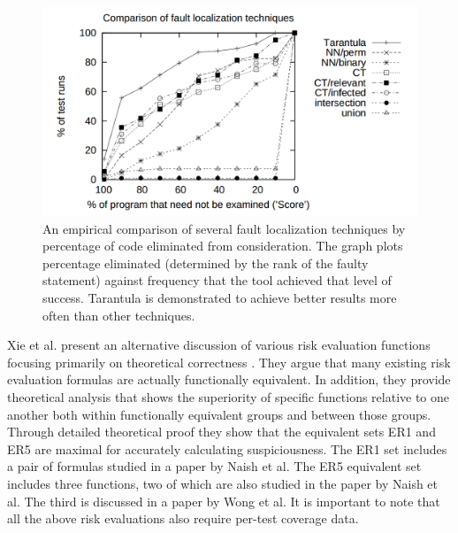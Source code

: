 \documentclass[11pt]{article}
\begin{document}
\begin{figure}
  \centering
  \includegraphics[width=0.9\linewidth]{img/tareff.png}
  \caption{An empirical comparison of several fault localization
  techniques by percentage of code eliminated from consideration.  The
  graph plots percentage eliminated (determined by the rank of the
  faulty statement) against frequency that the tool achieved that level
  of success.  Tarantula is demonstrated to achieve better results more
  often than other techniques.}
  \label{tareval}
\end{figure}

Xie et al. present an alternative discussion of various risk evaluation 
functions focusing primarily on theoretical correctness \cite{theory}. They 
argue that many existing risk evaluation formulas are actually functionally
equivalent.  In addition, they provide theoretical analysis that shows the 
superiority of specific functions relative to one another both within 
functionally equivalent groups and between those groups. Through detailed
theoretical proof they show that the equivalent sets ER1 and ER5 are maximal
for accurately calculating suspiciousness.  The ER1 set includes a pair of 
formulas studied in a paper by Naish et al. \cite{naish}  The ER5 equivalent 
set includes three functions, two of which are also studied in the paper
by Naish et al. The third is discussed in a paper by Wong et al. \cite{wong}
It is important to note that all the above risk evaluations also require
per-test coverage data.
\end{document}
